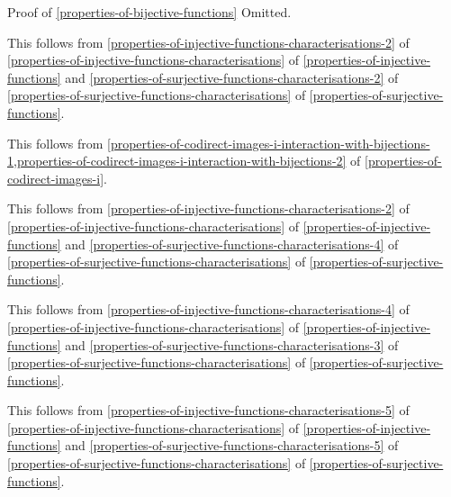 \begin{Proof}{Proof of \cref{properties-of-bijective-functions}}
    Omitted.

    This follows from \cref{properties-of-injective-functions-characterisations-2} of \cref{properties-of-injective-functions-characterisations} of \cref{properties-of-injective-functions} and \cref{properties-of-surjective-functions-characterisations-2} of \cref{properties-of-surjective-functions-characterisations} of \cref{properties-of-surjective-functions}.

    This follows from \cref{properties-of-codirect-images-i-interaction-with-bijections-1,properties-of-codirect-images-i-interaction-with-bijections-2} of \cref{properties-of-codirect-images-i}.

    This follows from \cref{properties-of-injective-functions-characterisations-2} of \cref{properties-of-injective-functions-characterisations} of \cref{properties-of-injective-functions} and \cref{properties-of-surjective-functions-characterisations-4} of \cref{properties-of-surjective-functions-characterisations} of \cref{properties-of-surjective-functions}.

    This follows from \cref{properties-of-injective-functions-characterisations-4} of \cref{properties-of-injective-functions-characterisations} of \cref{properties-of-injective-functions} and \cref{properties-of-surjective-functions-characterisations-3} of \cref{properties-of-surjective-functions-characterisations} of \cref{properties-of-surjective-functions}.

    This follows from \cref{properties-of-injective-functions-characterisations-5} of \cref{properties-of-injective-functions-characterisations} of \cref{properties-of-injective-functions} and \cref{properties-of-surjective-functions-characterisations-5} of \cref{properties-of-surjective-functions-characterisations} of \cref{properties-of-surjective-functions}.


\end{Proof}
